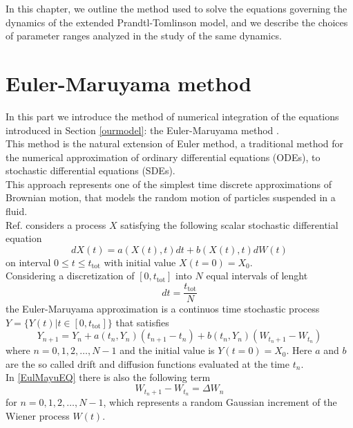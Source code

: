 In this chapter, we outline the method used to solve the equations governing the dynamics of the extended Prandtl-Tomlinson model, and we describe the choices of parameter ranges analyzed in the study of the same dynamics.
\section{Euler-Maruyama method}
In this part we introduce the method of numerical integration of the equations introduced in Section \ref{ourmodel}: the Euler-Maruyama method \cite{Euler}.
\\
This method is the natural extension of Euler method, a traditional method for the numerical approximation of ordinary differential equations (ODEs), to stochastic differential equations (SDEs).
\\
This approach represents one of the simplest time discrete approximations of Brownian motion, that models the random motion of particles suspended in a fluid.
\\
Ref.\cite{Euler} considers a process $X$ satisfying the following scalar stochastic differential equation
\begin{equation}
    dX(t) = a(X(t),t) dt + b(X(t),t) dW(t)
\end{equation}
on interval $0 \leq t \leq t_\text{tot}$ with initial value $X(t=0)=X_0$.
\\
Considering a discretization of $[0,t_\text{tot}]$ into $N$ equal intervals of lenght 
\begin{equation}
    dt=\frac{t_\text{tot}}{N}
    \label{eq:passo}
\end{equation}
the Euler-Maruyama approximation is a continuos time stochastic process $Y=\{Y(t) | t\in [0,t_\text{tot}]\}$ that satisfies 
\begin{equation}
    Y_{n+1} = Y_n + a(t_n,Y_n) (t_{n+1} -t_n) + b(t_n,Y_n) (W_{t_n + 1} - W_{t_n})
    \label{EulMayuEQ}
\end{equation}
where $n = 0,1,2,\dots,N-1$ and the initial value is $Y(t=0) = X_0$. Here $a$ and $b$ are the so called drift and diffusion functions evaluated at the time $t_n$.
\\
In \eqref{EulMayuEQ} there is also the following term 
\begin{equation}
    W_{t_n + 1} - W_{t_n} = \Delta W_n
\end{equation}
for $n = 0,1,2,\dots,N-1$, which represents a random Gaussian increment of the Wiener process $W(t)$.

